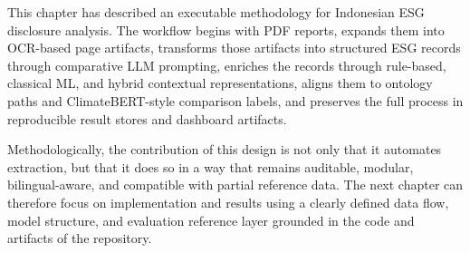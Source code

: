 \documentclass[english, online, cse, master]{dithesis}
\begin{document}
This chapter has described an executable methodology for Indonesian ESG disclosure analysis. The workflow begins with PDF reports, expands them into OCR-based page artifacts, transforms those artifacts into structured ESG records through comparative LLM prompting, enriches the records through rule-based, classical ML, and hybrid contextual representations, aligns them to ontology paths and ClimateBERT-style comparison labels, and preserves the full process in reproducible result stores and dashboard artifacts.

Methodologically, the contribution of this design is not only that it automates extraction, but that it does so in a way that remains auditable, modular, bilingual-aware, and compatible with partial reference data. The next chapter can therefore focus on implementation and results using a clearly defined data flow, model structure, and evaluation reference layer grounded in the code and artifacts of the repository.
\end{document}
